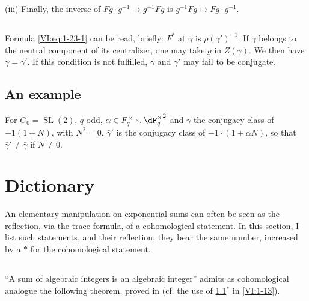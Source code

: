(iii) Finally, the inverse of $F g\cdot g^{-1}\mapsto g^{-1} F g$ is
$g^{-1} F g\mapsto F g\cdot g^{-1}$. 





\subsection{}\label{VI:1-25}

Formula \eqref{VI:eq:1-23-1} can be read, briefly: $F^\ast$ at
$\gamma$ is $\rho(\gamma')^{-1}$. If $\gamma$ belongs to the neutral
component of its centraliser, one may take $g$ in $Z(\gamma)$. We then have
$\gamma=\gamma'$. If this condition is not fulfilled, $\gamma$ and $\gamma'$
may fail to be conjugate. 





\subsection{An example}\label{VI:1-26}

For $G_0=\operatorname{SL}(2)$, $q$ odd,
$\alpha\in F_q^\times\setminus {\dF_q^\times}^2$ and $\bar\gamma$ the
conjugacy class of $-1(1+N)$, with $N^2=0$, $\bar\gamma'$ is the
conjugacy class of $-1\cdot (1+\alpha N)$, so that $\bar\gamma'\ne \bar\gamma$
if $N\ne 0$. 










\section{Dictionary}\label{VI:2}

An elementary manipulation on exponential sums can often
be seen as the reflection, via the trace formula, of a cohomological
statement. In this section, I list such statements, and their
reflection; they bear the same number, increased by a $\ast$ for
the cohomological statement. 





\subsection{}\label{VI:2-1}

``A sum of algebraic integers is an algebraic integer'' admits as
cohomological analogue the following theorem, proved in
\cite[XXI 5.2.2]{sga7} (cf. the use of \ref{VI:2-1}$^\ast$ in
\ref{VI:1-13}). 





